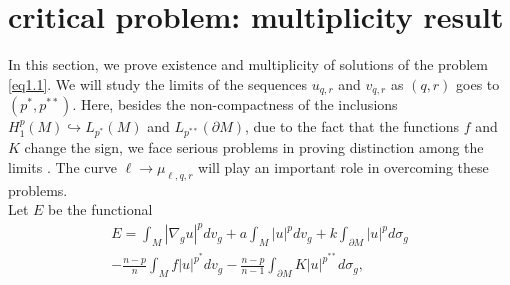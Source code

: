 \documentclass{Tran-l}
\theoremstyle{definition}
\theoremstyle{remark}
\numberwithin{equation}{section}
\begin{document}
\section{critical problem: multiplicity result}
In this section, we prove existence and multiplicity of solutions of
the problem \eqref{eq1.1}. We will study the limits of the sequences
$u_{q,r}$ and $v_{q,r}$ as $(q,r)$ goes to$(p^*,p^{**})$. Here,
besides the non-compactness of the inclusions
$H^p_1(M)\hookrightarrow L_{p^*}(M)$ and $L_{p^{**}}(\partial M)$,
due to the fact that the functions $f$ and $K$ change the sign, we
face serious problems in proving distinction among the limits . The
curve $\ell\to \mu_{\ell,q,r}$ will play an important role in
overcoming these problems. \\
Let $E$ be the functional
\begin{eqnarray*}
&E=\int_M|\nabla_gu|^{p}dv_g+a\int_M|u|^pdv_g+k\int_{\partial
M}|u|^pd\sigma_g&\\&-\frac{n-p}{n}\int_Mf|u|^{p^*}dv_g-\frac{n-p}{n-1}\int_{\partial
M}K|u|^{p^{**}}d\sigma_g,&
\end{eqnarray*}
\end{document}
